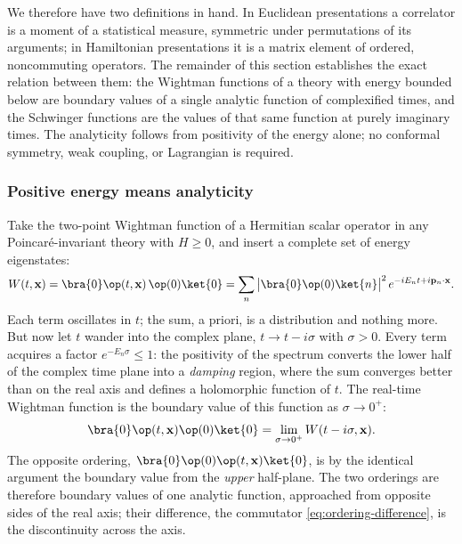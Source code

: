 We therefore have two definitions in hand. In Euclidean presentations a
correlator is a moment of a statistical measure, symmetric under permutations
of its arguments; in Hamiltonian presentations it is a matrix element of
ordered, noncommuting operators. The remainder of this section establishes
the exact relation between them: the Wightman functions of a theory with
energy bounded below are boundary values of a single analytic function of
complexified times, and the Schwinger functions are the values of that same
function at purely imaginary times. The analyticity follows from positivity
of the energy alone; no conformal symmetry, weak coupling, or Lagrangian is
required.

\subsubsection{Positive energy means analyticity}
\label{sec:positive-energy-analyticity}

Take the two-point Wightman function of a Hermitian scalar operator in any
Poincar\'e-invariant theory with $H \ge 0$, and insert a complete set of energy
eigenstates:
\begin{equation}
W(t, \mathbf{x}) = \bra{0}\op(t, \mathbf{x})\, \op(0)\ket{0}
= \sum_n \big|\bra{0}\op(0)\ket{n}\big|^2 \, e^{-iE_n t + i \mathbf{p}_n \cdot \mathbf{x}}.
\label{eq:spectral-sum}
\end{equation}
Each term oscillates in $t$; the sum, a priori, is a distribution and nothing
more. But now let $t$ wander into the complex plane, $t \to t - i\sigma$ with
$\sigma > 0$. Every term acquires a factor $e^{-E_n \sigma} \le 1$: the
positivity of the spectrum converts the lower half of the complex time plane
into a \emph{damping} region, where the sum converges better than on the real
axis and defines a holomorphic function of $t$. The real-time Wightman function
is the boundary value of this function as $\sigma \to 0^+$:
\begin{equation}
\bra{0}\op(t,\mathbf{x})\op(0)\ket{0} = \lim_{\sigma \to 0^+} W(t - i\sigma, \mathbf{x}).
\label{eq:boundary-value}
\end{equation}
The opposite ordering, $\bra{0}\op(0)\op(t,\mathbf{x})\ket{0}$, is by the
identical argument the boundary value from the \emph{upper} half-plane. The
two orderings are therefore boundary values of one analytic function,
approached from opposite sides of the real axis; their difference, the
commutator \eqref{eq:ordering-difference}, is the discontinuity across the
axis.

